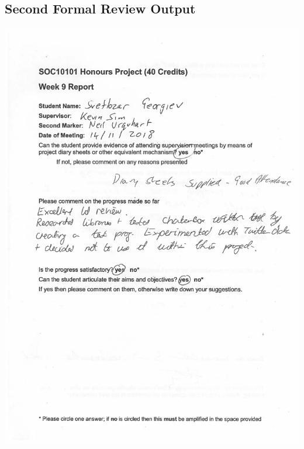 \documentclass[12pt,a4paper]{article}
\begin{document}
\begin{appendices}
\section{Second Formal Review Output}\label{app:interim}
\includegraphics[width=\textwidth,height=\textheight,keepaspectratio]{interim-1.png}
\newpage

\end{appendices}
\end{document}
